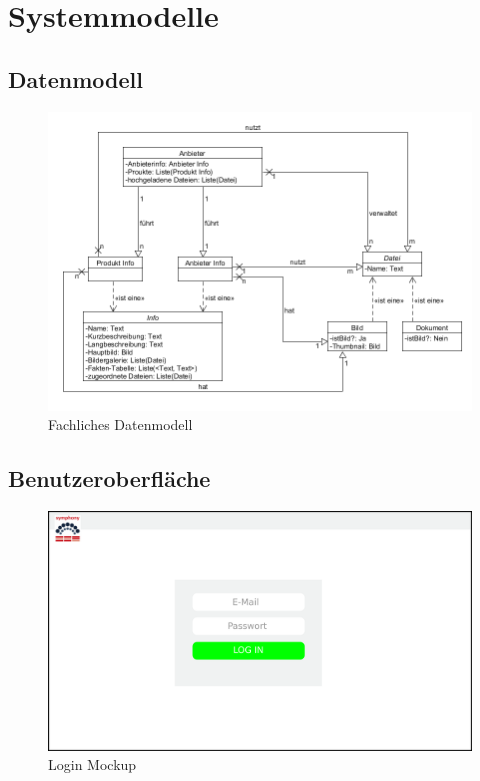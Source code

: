 \documentclass[a4paper,12pt]{article}
\begin{document}
\section{Systemmodelle}

\subsection{Datenmodell}

\begin{figure}[!htb]
  \centering
     \includegraphics[width=1.0\textwidth]{FDM.png}
  \caption{Fachliches Datenmodell}
  \label{fig:fmd}
\end{figure}

\clearpage

\subsection{Benutzeroberfläche}

\begin{figure}[!htb]
  \centering
     \includegraphics[width=1.0\textwidth]{projmicro_login.png}
  \caption{Login Mockup}
  \label{fig:login}
\end{figure}
\end{document}
